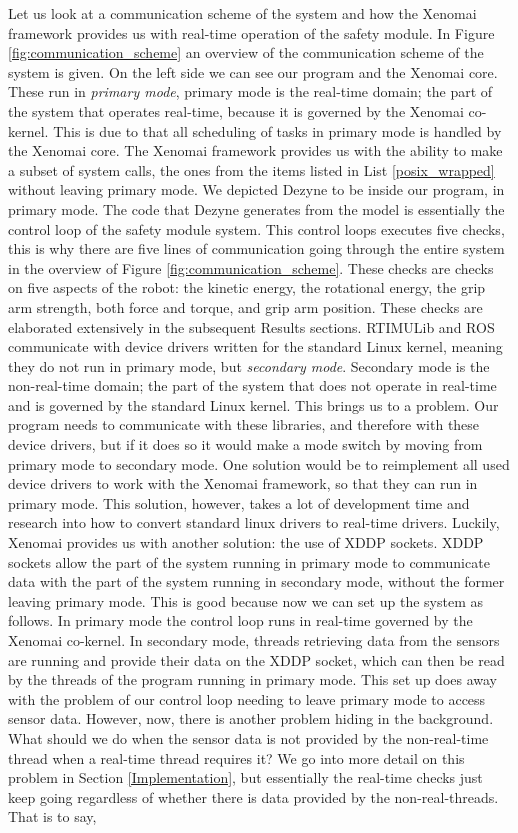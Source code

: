 \documentclass[12pt]{scrreprt}
\begin{document}
Let us look at a communication scheme of the system and how the Xenomai framework provides us with real-time operation of the safety module. In Figure \ref{fig:communication_scheme} an overview of the communication scheme of the system is given. On the left side we can see our program and the Xenomai core. These run in \textit{primary mode}, primary mode is the real-time domain; the part of the system that operates real-time, because it is governed by the Xenomai co-kernel. This is due to that all scheduling of tasks in primary mode is handled by the Xenomai core. The Xenomai framework provides us with the ability to make a subset of system calls, the ones from the items listed in List \ref{posix_wrapped} without leaving primary mode. We depicted Dezyne to be inside our program, in primary mode. The code that Dezyne generates from the model is essentially the control loop of the safety module system. This control loops executes five checks, this is why there are five lines of communication going through the entire system in the overview of Figure \ref{fig:communication_scheme}. These checks are checks on five aspects of the robot: the kinetic energy, the rotational energy, the grip arm strength, both force and torque, and grip arm position. These checks are elaborated extensively in the subsequent Results sections. RTIMULib and ROS communicate with device drivers written for the standard Linux kernel, meaning they do not run in primary mode, but \textit{secondary mode}. Secondary mode is the non-real-time domain; the part of the system that does not operate in real-time and is governed by the standard Linux kernel. This brings us to a problem. Our program needs to communicate with these libraries, and therefore with these device drivers, but if it does so it would make a mode switch by moving from primary mode to secondary mode. One solution would be to reimplement all used device drivers to work with the Xenomai framework, so that they can run in primary mode. This solution, however, takes a lot of development time and research into how to convert standard linux drivers to real-time drivers. Luckily, Xenomai provides us with another solution: the use of XDDP sockets. XDDP sockets allow the part of the system running in primary mode to communicate data with the part of the system running in secondary mode, without the former leaving primary mode. This is good because now we can set up the system as follows. In primary mode the control loop runs in real-time governed by the Xenomai co-kernel. In secondary mode, threads retrieving data from the sensors are running and provide their data on the XDDP socket, which can then be read by the threads of the program running in primary mode. This set up does away with the problem of our control loop needing to leave primary mode to access sensor data. However, now, there is another problem hiding in the background. What should we do when the sensor data is not provided by the non-real-time thread when a real-time thread requires it? We go into more detail on this problem in Section \ref{Implementation}, but essentially the real-time checks just keep going regardless of whether there is data provided by the non-real-threads. That is to say, 
\end{document}
